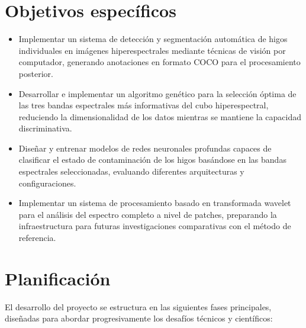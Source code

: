 \section{Objetivos específicos}
\begin{itemize}
    \item Implementar un sistema de detección y segmentación automática de higos individuales en imágenes hiperespectrales mediante técnicas de visión por computador, generando anotaciones en formato COCO para el procesamiento posterior.
    \item Desarrollar e implementar un algoritmo genético para la selección óptima de las tres bandas espectrales más informativas del cubo hiperespectral, reduciendo la dimensionalidad de los datos mientras se mantiene la capacidad discriminativa.
    \item Diseñar y entrenar modelos de redes neuronales profundas capaces de clasificar el estado de contaminación de los higos basándose en las bandas espectrales seleccionadas, evaluando diferentes arquitecturas y configuraciones.
    \item Implementar un sistema de procesamiento basado en transformada wavelet para el análisis del espectro completo a nivel de patches, preparando la infraestructura para futuras investigaciones comparativas con el método de referencia.
\end{itemize}

\newpage
\section{Planificación}
El desarrollo del proyecto se estructura en las siguientes fases principales, diseñadas para abordar progresivamente los desafíos técnicos y científicos:

